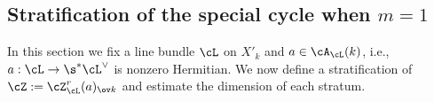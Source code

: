 %
%
%


\subsection{Stratification of the special cycle when $m=1$}\label{ss:strat KR div}
In this section we fix a line bundle $\cL$ on $X'_{k}$ and $a\in \cA_{\cL}(k)$, i.e.,  $a: \cL\to \s^{*}\cL^{\vee}$ is nonzero Hermitian. We now define a stratification of $\cZ:=\cZ_{\cL}^{r}(a)_{\ov k}$ and estimate the dimension of each stratum.

